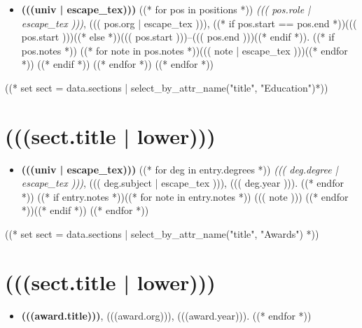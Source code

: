 \documentclass[10pt,oneside]{article}
\begin{document}
\mbox{}\vspace{-\dimexpr\baselineskip\relax}

\begin{itemize}[label={}]
  ((* for univ, positions in sect.entries.items() *))
  \item \textbf{(((univ | escape_tex)))}
        ((* for pos in positions *))
        \textit{((( pos.role | escape_tex )))}, ((( pos.org | escape_tex ))), ((* if pos.start == pos.end *))((( pos.start )))((* else *))((( pos.start )))--((( pos.end )))((* endif *)).
        ((* if pos.notes *))
        ((* for note in pos.notes *))((( note | escape_tex )))((* endfor *))
        ((* endif *))
        ((* endfor *))
        ((* endfor *))
\end{itemize}

((* set sect = data.sections | select_by_attr_name("title", "Education")*))
\section{(((sect.title | lower)))}

\mbox{}\vspace{-\dimexpr\baselineskip\relax}

\begin{itemize}[label={}]
  ((* for univ, entry in sect.entries.items() *))
  \item \textbf{(((univ | escape_tex)))}
        ((* for deg in entry.degrees *))
        \textit{((( deg.degree | escape_tex )))}, ((( deg.subject | escape_tex ))), ((( deg.year ))).
        ((* endfor *))
        ((* if entry.notes *))((* for note in entry.notes *))
        ((( note )))
        ((* endfor *))((* endif *))
        ((* endfor *))
\end{itemize}

((* set sect = data.sections | select_by_attr_name("title", "Awards") *))
\section{(((sect.title | lower)))}

\mbox{}\vspace{-\dimexpr\baselineskip\relax}

\begin{itemize}[label={}]
  ((* for award in sect.entries.awards | sort_by_attr(["year"], reverse=True) *))
  \item \textbf{(((award.title)))}, (((award.org))), (((award.year))).
        ((* endfor *))
\end{itemize}
\end{document}
